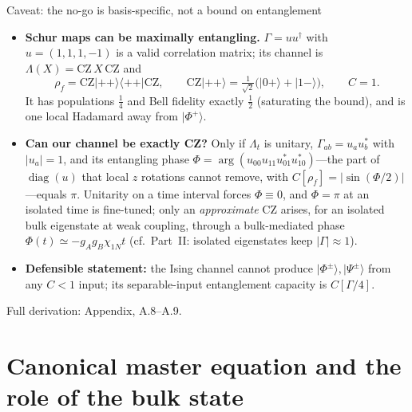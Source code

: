 \documentclass[aspectratio=169,11pt]{beamer}
\newcommand{\ket}[1]{\lvert #1\rangle}
\newcommand{\bra}[1]{\langle #1\rvert}
\newcommand{\diag}{\operatorname{diag}}
\newcommand{\appref}[1]{{\color{muted}\footnotesize Full derivation: Appendix, #1.}}
\begin{document}
\begin{frame}[shrink=4]{Caveat: the no-go is basis-specific, not a bound on entanglement}
\small
\begin{itemize}\setlength\itemsep{3pt}
\item \textbf{Schur maps can be maximally entangling.} $\Gamma=uu^\dagger$ with $u=(1,1,1,-1)$ is a valid correlation matrix; its channel is $\Lambda(X)=\mathrm{CZ}\,X\,\mathrm{CZ}$ and
\[
\rho_f=\mathrm{CZ}\ket{++}\bra{++}\mathrm{CZ},\qquad \mathrm{CZ}\ket{++}=\tfrac1{\sqrt2}\bigl(\ket{0+}+\ket{1-}\bigr),\qquad C=1 .
\]
It has populations $\tfrac14$ and Bell fidelity exactly $\tfrac12$ (saturating the bound), and is one local Hadamard away from $\ket{\Phi^+}$.
\item \textbf{Can our channel be exactly CZ?} Only if $\Lambda_t$ is unitary, $\Gamma_{ab}=u_au_b^*$ with $\lvert u_a\rvert=1$, and its entangling phase $\Phi=\arg(u_{00}u_{11}u_{01}^*u_{10}^*)$---the part of $\diag(u)$ that local $z$ rotations cannot remove, with $C[\rho_f]=\lvert\sin(\Phi/2)\rvert$---equals $\pi$. Unitarity on a time interval forces $\Phi\equiv0$, and $\Phi=\pi$ at an isolated time is fine-tuned; only an \emph{approximate} CZ arises, for an isolated bulk eigenstate at weak coupling, through a bulk-mediated phase $\Phi(t)\simeq-g_Ag_B\chi_{1N}t$ (cf.\ Part~II: isolated eigenstates keep $\lvert\Gamma\rvert\approx1$).
\item \textbf{Defensible statement:} the Ising channel cannot produce $\ket{\Phi^\pm},\ket{\Psi^\pm}$ from any $C<1$ input; its separable-input entanglement capacity is $C[\Gamma/4]$.
\end{itemize}
\appref{A.8--A.9}
\end{frame}

\section{Canonical master equation and the role of the bulk state}
\end{document}
